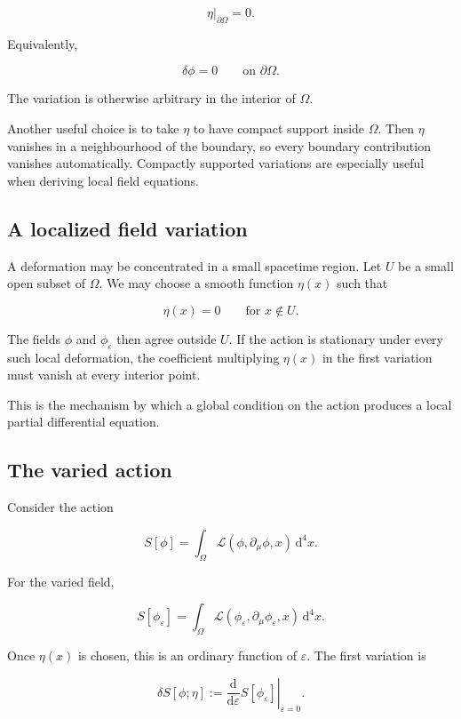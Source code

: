 \[
\boxed{
\eta|_{\partial\Omega}=0
}.
\]

Equivalently,

\[
\delta\phi=0
\qquad
\text{on }\partial\Omega.
\]

The variation is otherwise arbitrary in the interior of \(\Omega\).

Another useful choice is to take \(\eta\) to have compact support inside \(\Omega\). Then \(\eta\) vanishes in a neighbourhood of the boundary, so every boundary contribution vanishes automatically. Compactly supported variations are especially useful when deriving local field equations.

\subsection{A localized field variation}

A deformation may be concentrated in a small spacetime region. Let \(U\) be a small open subset of \(\Omega\). We may choose a smooth function \(\eta(x)\) such that

\[
\eta(x)=0
\qquad
\text{for }x\notin U.
\]

The fields \(\phi\) and \(\phi_{\varepsilon}\) then agree outside \(U\). If the action is stationary under every such local deformation, the coefficient multiplying \(\eta(x)\) in the first variation must vanish at every interior point.

This is the mechanism by which a global condition on the action produces a local partial differential equation.

\subsection{The varied action}

Consider the action

\[
S[\phi]
=
\int_{\Omega}
\mathcal{L}(\phi,\partial_{\mu}\phi,x)
\,\mathrm{d}^{4}x.
\]

For the varied field,

\[
S[\phi_{\varepsilon}]
=
\int_{\Omega}
\mathcal{L}(
\phi_{\varepsilon},
\partial_{\mu}\phi_{\varepsilon},
x)
\,\mathrm{d}^{4}x.
\]

Once \(\eta(x)\) is chosen, this is an ordinary function of \(\varepsilon\). The first variation is

\[
\boxed{
\delta S[\phi;\eta]
:=
\left.
\frac{\mathrm{d}}{\mathrm{d}\varepsilon}
S[\phi_{\varepsilon}]
\right|_{\varepsilon=0}
}.
\]

